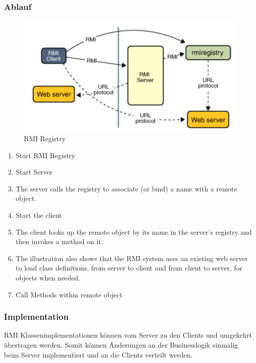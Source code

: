 \clearpage


\subsubsection{Ablauf}

\begin{figure}[h!]
	\centering
	\includegraphics[width=0.7\linewidth]{img/rmi_registry}
	\caption{RMI Registry}
	\label{fig:rmiregistry}
\end{figure}

\begin{enumerate}
	\item Start RMI Registry
	\item Start Server
	\item The server calls the registry to associate (or bind) a name with a remote object.
	\item Start the client
	\item The client looks up the remote object by its name in the server's registry and then invokes a method on it.
	\item The illustration also shows that the RMI system uses an existing web server to load class definitions, from server to client and from client to server, for objects when needed.
	\item Call Methods within remote object
\end{enumerate}


\subsubsection{Implementation}
RMI Klassenimplementationen können vom Server zu den Clients und umgekehrt übertragen werden. Somit können Änderungen an der Businesslogik einmalig beim Server implementiert und an die Clients verteilt werden.

